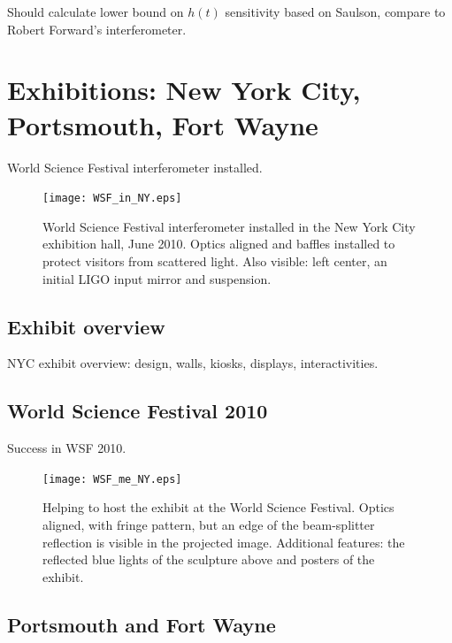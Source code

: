 Should calculate lower bound on $h(t)$ sensitivity based on Saulson, compare to Robert Forward's interferometer.


    \section{Exhibitions: New York City, Portsmouth, Fort Wayne}
    \label{exhibitions}

        World Science Festival interferometer installed.

	\begin{figure}
	\begin{center}
	\texttt{[image: WSF\_in\_NY.eps]}
	\caption{World Science Festival interferometer installed in the New York City exhibition hall, June 2010. Optics aligned and baffles installed to protect visitors from scattered light. Also visible: left center, an initial LIGO input mirror and suspension.}
	\label{WSF_IFO_photo}
	\end{center}
	\end{figure}


        \subsection{Exhibit overview}
        \label{exhibit_overview}

            NYC exhibit overview: design, walls, kiosks, displays, interactivities.

        \subsection{World Science Festival 2010}
        \label{WSF2010}

            Success in WSF 2010.

	\begin{figure}
	\begin{center}
	\texttt{[image: WSF\_me\_NY.eps]}
	\caption{Helping to host the exhibit at the World Science Festival. Optics aligned, with fringe pattern, but an edge of the beam-splitter reflection is visible in the projected image. Additional features: the reflected blue lights of the sculpture above and posters of the exhibit.}
	\label{WSF_IFO_me}
	\end{center}
	\end{figure}


        \subsection{Portsmouth and Fort Wayne}
        \label{secondary_installations}

